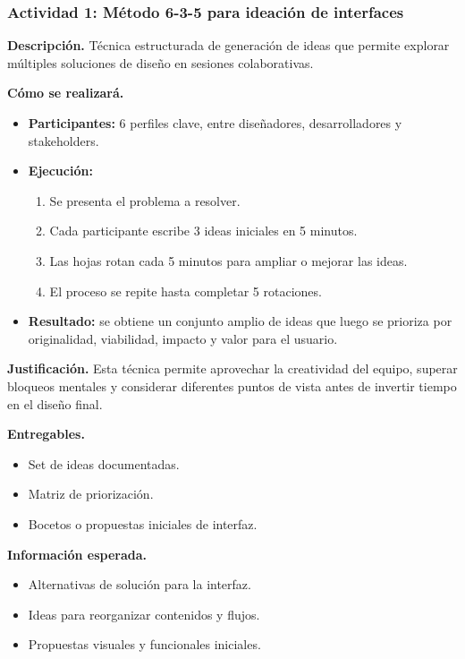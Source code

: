 \documentclass[12pt,letterpaper]{article}
\begin{document}
\subsubsection{Actividad 1: Método 6-3-5 para ideación de interfaces}

\textbf{Descripción.} Técnica estructurada de generación de ideas que permite explorar múltiples soluciones de diseño en sesiones colaborativas.

\textbf{Cómo se realizará.}
\begin{itemize}
    \item \textbf{Participantes:} 6 perfiles clave, entre diseñadores, desarrolladores y stakeholders.
    \item \textbf{Ejecución:}
    \begin{enumerate}
        \item Se presenta el problema a resolver.
        \item Cada participante escribe 3 ideas iniciales en 5 minutos.
        \item Las hojas rotan cada 5 minutos para ampliar o mejorar las ideas.
        \item El proceso se repite hasta completar 5 rotaciones.
    \end{enumerate}
    \item \textbf{Resultado:} se obtiene un conjunto amplio de ideas que luego se prioriza por originalidad, viabilidad, impacto y valor para el usuario.
\end{itemize}

\textbf{Justificación.} Esta técnica permite aprovechar la creatividad del equipo, superar bloqueos mentales y considerar diferentes puntos de vista antes de invertir tiempo en el diseño final.

\textbf{Entregables.}
\begin{itemize}
    \item Set de ideas documentadas.
    \item Matriz de priorización.
    \item Bocetos o propuestas iniciales de interfaz.
\end{itemize}

\textbf{Información esperada.}
\begin{itemize}
    \item Alternativas de solución para la interfaz.
    \item Ideas para reorganizar contenidos y flujos.
    \item Propuestas visuales y funcionales iniciales.
\end{itemize}
\end{document}

